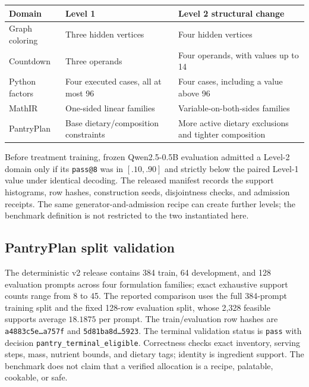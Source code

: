 \begin{center}
\small
\begin{tabularx}{.96\linewidth}{@{}lYY@{}}
\toprule
\textbf{Domain} & \textbf{Level 1} & \textbf{Level 2 structural change} \\
\midrule
Graph coloring & Three hidden vertices & Four hidden vertices \\
Countdown & Three operands & Four operands, with values up to 14 \\
Python factors & Four executed cases, all at most 96 & Four cases, including a value above 96 \\
MathIR & One-sided linear families & Variable-on-both-sides families \\
PantryPlan & Base dietary/composition constraints & More active dietary exclusions and tighter composition \\
\bottomrule
\end{tabularx}
\end{center}

Before treatment training, frozen Qwen2.5-0.5B evaluation admitted a Level-2
domain only if its \texttt{pass@8} was in $[.10,.90]$ and strictly below the
paired Level-1 value under identical decoding. The released manifest
 records the support
histograms, row hashes, construction seeds, disjointness checks, and admission
receipts. The same generator-and-admission recipe can create further levels;
the benchmark definition is not restricted to the two instantiated here.

\subsection{PantryPlan split validation}
\label{app:data-pantry}

The deterministic v2 release contains 384
train, 64 development, and 128 evaluation prompts across four formulation
families; exact exhaustive support counts range from 8 to 45. The reported
comparison uses the full 384-prompt training split and the
fixed 128-row evaluation split, whose 2,328 feasible supports average
$18.1875$ per prompt.
The train/evaluation row hashes are \texttt{a4883c5e\ldots a757f} and
\texttt{5d81ba8d\ldots5923}. The terminal validation status is \texttt{pass} with
decision \texttt{pantry\_terminal\_eligible}. Correctness checks exact inventory,
serving steps, mass, nutrient bounds, and dietary tags; identity is ingredient
support. The benchmark does not claim that a verified allocation is a recipe,
palatable, cookable, or safe.

